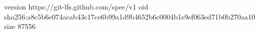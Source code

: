version https://git-lfs.github.com/spec/v1
oid sha256:a8c5b6e074acab43c17ce6b99a1d9b4652b6c0004b1e9ef063ed71b0b270aa10
size 87556
